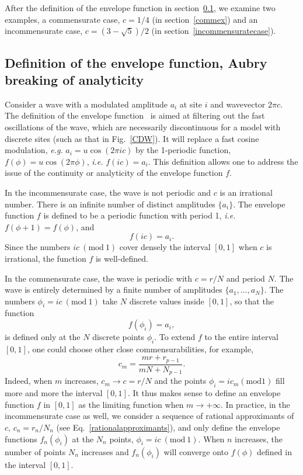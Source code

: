 \documentclass[]{revtex4-1}
\begin{document}
After the definition of the envelope function in section~\ref{defenvsection}, we examine two examples, a commensurate case, $c=1/4$ (in section~\ref{commex}) and an incommensurate case, $c=(3-\sqrt{5})/2$ (in section~\ref{incommensuratecase}).

\subsection{Definition of the envelope function, Aubry breaking of analyticity} \label{defenvsection}


Consider a wave with a modulated amplitude $a_i$ at site $i$ and wavevector $2\pi c$.   The definition of the envelope function~\cite{envnote}   is aimed at filtering out the fast oscillations of the wave, which are necessarily discontinuous for a model with discrete sites (such as that in Fig.~\ref{CDW}). It will replace a fast cosine modulation, \textit{e.g.} $a_i=u \cos (2\pi ic)$ by the 1-periodic function, $f(\phi)=u \cos(2\pi \phi)$, \textit{i.e.} $f(ic)=a_i$. This definition allows one to address the issue of the continuity or analyticity of the envelope function $f$.

In the incommensurate case, the wave is not periodic and $c$ is an irrational number. There is an infinite number of distinct amplitudes $\{a_i\}$. The envelope function $f$ is defined to be a periodic function with period 1, \textit{i.e.} $f(\phi+1)=f(\phi)$, and
 \begin{equation}
 f(i c) = a_i. \label{defenv}
 \end{equation}
 Since the numbers $ic~(\mbox{mod}~1)$ cover densely the  interval $[0,1]$ when $c$ is irrational, the function $f$ is well-defined. %
 
 In the commensurate case, the wave is periodic with $c=r/N$ and period $N$. The wave is entirely determined by a finite number of amplitudes $\{a_1, \dots, a_N\}$. The numbers $\phi_i=ic~(\mbox{mod}~1)$ take $N$ discrete values inside $[0,1]$, so that the function
 \begin{equation}
 f(\phi_i) = a_i, \label{defenvcommensurate}
 \end{equation}
is defined only at the $N$ discrete points $\phi_i$.
 To extend $f$ to the entire interval $[0,1]$, one could choose other close commensurabilities, for example,
 \begin{equation}
 c_m=\frac{mr+r_{p-1}}{mN+N_{p-1}}.
 \end{equation}
 Indeed, when $m$ increases, $c_m \rightarrow c=r/N$ and the points $\phi_i=ic_m (\mbox{mod} 1)$ fill more and more the  interval $[0,1]$. It thus makes sense to define an envelope function $f$ in $[0,1]$ as the limiting function when $m \rightarrow +\infty$.
 In practice, in the incommensurate case as well, we consider a sequence of rational approximants of $c$, $c_n=r_n/N_n$ (see Eq.~\ref{rationalapproximants}), and only define the envelope functions $f_n(\phi_i)$   at the $N_n$ points, $\phi_i=ic~(\mbox{mod}~1)$. When $n$ increases, the number of points $N_n$ increases and $f_n(\phi_i)$ will converge onto $f(\phi)$ defined in the  interval $[0,1]$.
  
\end{document}
